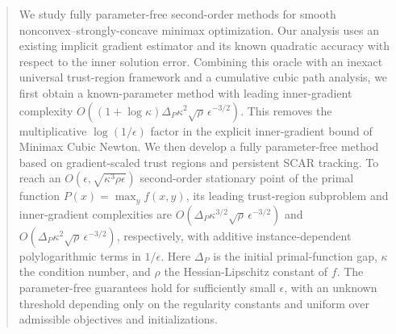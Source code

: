 \begin{abstract}
We study fully parameter-free second-order methods for smooth
nonconvex--strongly-concave minimax optimization. Our analysis uses an
existing implicit gradient estimator and its known quadratic accuracy
with respect to the inner solution error. Combining this oracle with
an inexact universal trust-region framework and a cumulative cubic
path analysis, we first obtain a known-parameter method with leading
inner-gradient complexity
$O((1+\log\kappa)\Delta_P\kappa^2\sqrt{\rho}\,\epsilon^{-3/2})$.
This removes the multiplicative $\log(1/\epsilon)$ factor in the
explicit inner-gradient bound of Minimax Cubic Newton.
We then develop a fully parameter-free method based on
gradient-scaled trust regions and persistent SCAR tracking.
To reach an $O(\epsilon,\sqrt{\kappa^3\rho\epsilon})$ second-order
stationary point of the primal function $P(x)=\max_y f(x,y)$,
its leading trust-region subproblem and inner-gradient complexities
are
$O(\Delta_P\kappa^{3/2}\sqrt{\rho}\,\epsilon^{-3/2})$ and
$O(\Delta_P\kappa^2\sqrt{\rho}\,\epsilon^{-3/2})$, respectively,
with additive instance-dependent polylogarithmic terms in
$1/\epsilon$.
Here $\Delta_P$ is the initial primal-function gap, $\kappa$ the
condition number, and $\rho$ the Hessian-Lipschitz constant of $f$.
The parameter-free guarantees hold for sufficiently small $\epsilon$,
with an unknown threshold depending only on the regularity constants
and uniform over admissible objectives and initializations.
\end{abstract}

